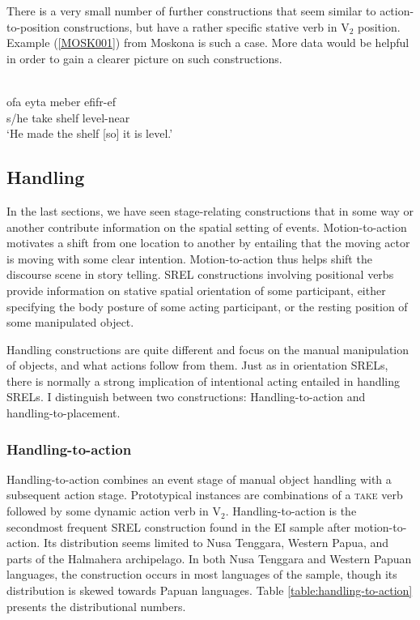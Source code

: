 There is a very small number of further constructions that seem similar to action-to-position constructions, but have a rather specific stative verb in V$_2$ position. Example (\ref{MOSK001}) from Moskona is such a case. More data would be helpful in order to gain a clearer picture on such constructions.

\ea \label{MOSK001}
\\
\gll ofa eyta meber efifr-ef \\
s/he take shelf level-near \\
\glft ‘He made the shelf [so] it is level.’\\ 
\z

\subsection{Handling}

In the last sections, we have seen stage-relating constructions that in some way or another contribute information on the spatial setting of events. Motion-to-action motivates a shift from one location to another by entailing that the moving actor is moving with some clear intention. Motion-to-action thus helps shift the discourse scene in story telling. SREL constructions involving positional verbs provide information on stative spatial orientation of some participant, either specifying the body posture of some acting participant, or the resting position of some manipulated object. 

Handling constructions are quite different and focus on the manual manipulation of objects, and what actions follow from them. Just as in orientation SRELs, there is normally a strong implication of intentional acting entailed in handling SRELs. I distinguish between two constructions: Handling-to-action and handling-to-placement. 

\subsubsection{Handling-to-action} \label{sec:handling-to-action}

Handling-to-action combines an event stage of manual object handling with a subsequent action stage. Prototypical instances are combinations of a \textsc{take} verb followed by some dynamic action verb in V$_2$. Handling-to-action is the secondmost frequent SREL construction found in the EI sample after motion-to-action. Its distribution seems limited to Nusa Tenggara, Western Papua, and parts of the Halmahera archipelago. In both Nusa Tenggara and Western Papuan languages, the construction occurs in most languages of the sample, though its distribution is skewed towards Papuan languages. Table \ref{table:handling-to-action} presents the distributional numbers.

